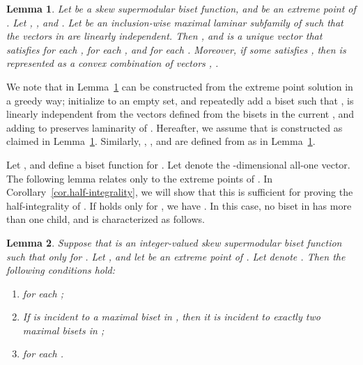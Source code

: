 \documentclass{article}
\newtheorem{lemma}{Lemma}
\begin{document}
\begin{lemma}\label{lem.terminal-laminar}
Let  be a skew supermodular biset function, 
and  be an extreme point of .
Let ,
, and
. 
Let  be an inclusion-wise maximal laminar subfamily
of 
such that the vectors in 
are linearly independent. Then
,
and  is a unique vector that satisfies
 for each ,
  for each , and  for each .
 Moreover, if some   satisfies
 ,
 then  is represented as a convex combination of vectors 
 ,  .
\end{lemma}

We note that  in Lemma~\ref{lem.terminal-laminar} can be
constructed from the extreme point solution  in a greedy
way;
initialize  to an empty set, and repeatedly add a biset 
such that ,  is linearly independent from the 
vectors defined from the bisets in the current , and adding  to  preserves
laminarity of .
Hereafter, we assume that  is constructed as claimed in Lemma~\ref{lem.terminal-laminar}.
Similarly, 
, , and  are defined from  as in Lemma~\ref{lem.terminal-laminar}.

Let ,
and define a biset function 
 for .
Let  denote the -dimensional all-one vector.
The following lemma relates only to the extreme points of .
In Corollary~\ref{cor.half-integrality}, we will show
that this is sufficient for proving the half-integrality of .
If  holds only for , 
we have . In this case, no biset in  
has more than one child, and  is characterized as follows.

\begin{lemma}\label{lem.terminal-characterization}
Suppose that  is an integer-valued skew supermodular biset function 
such that  only for .
Let ,
and let  be an extreme point of .
Let  denote .
 Then the following conditions hold\/{\rm :}
 \begin{enumerate}
  	\item[\rm (i)]  
	     for each \/{\rm ;}
  	\item[\rm (ii)] If  is incident to a maximal biset in , then it is incident to
  	exactly two maximal bisets in \/{\rm ;}
  	\item[\rm (iii)]  for each .
 \end{enumerate}
\end{lemma}
\end{document}
